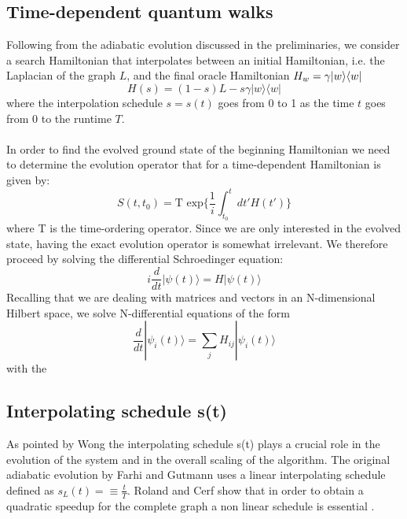     \subsection{Time-dependent quantum walks}
        Following from the adiabatic evolution discussed in the preliminaries, we consider a search Hamiltonian that interpolates between an initial Hamiltonian, i.e. the Laplacian of the graph $L$, and the final oracle Hamiltonian $H_w=\gamma{|{w}\rangle}{\langle{w}|}$
          \begin{equation}
            H(s) = (1-s)L - s\gamma|w\rangle\langle w|
          \end{equation}
        where the interpolation schedule $s=s(t)$ goes from 0 to 1 as the time $t$ goes from 0 to the runtime $T$. \\ \\In order to find the evolved ground state of the beginning Hamiltonian we need to determine the evolution operator that for a time-dependent Hamiltonian is given by:
        \begin{equation}
          S(t,t_0) = \mbox{T } \mbox{exp}\Big\{ \frac{1}{i}\int_{t_0}^{t} dt' H(t')\Big\}
        \end{equation}
        where T is the time-ordering operator. Since we are only interested in the evolved state, having the exact evolution operator is somewhat irrelevant.  We therefore proceed by solving the differential Schroedinger equation:
        \begin{equation}
          i\frac{d}{dt}|\psi(t)\rangle = H |\psi(t)\rangle
        \end{equation}
        Recalling that we are dealing with matrices and vectors in an N-dimensional Hilbert space, we solve N-differential equations of the form
        \begin{equation}
        \frac{d}{dt}|\psi_i(t)\rangle = \sum_jH_{ij}|\psi_i(t)\rangle
        \end{equation}
        with the \\

    \subsection{Interpolating schedule s(t)}\label{subsec:interpolating schedules}
        As pointed by Wong the interpolating schedule s(t) plays a crucial role in the evolution of the system and in the overall scaling of the algorithm.
        The original adiabatic evolution by Farhi and Gutmann \cite{Farhi2000} uses a linear interpolating schedule defined as $s_L(t) =\equiv \frac{t}{T}$. Roland and Cerf show that in order to obtain a quadratic speedup for the complete graph a non linear schedule is essential \cite{Roland2002}\cite{Morley2018}.


